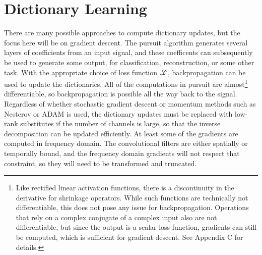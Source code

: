 \section{Dictionary Learning}
There are many possible approaches to compute dictionary updates, but the focus here will be on gradient descent. The pursuit algorithm generates several layers of coefficients from an input signal, and these coefficents can subsequently be used to generate some output, for classification, reconstruction, or some other task. With the appropriate choice of loss function $\mathscr{L}$, backpropagation can be used to update the dictionaries. All of the computations in pursuit are almost\footnote{Like rectified linear activation functions, there is a discontinuity in the derivative for shrinkage operators. While such functions are technically not differentiable, this does not pose any issue for backpropagation. Operations that rely on a complex conjugate of a complex input also are not differentiable, but since the output is a scalar loss function, gradients can still be computed, which is sufficient for gradient descent. See Appendix C for details.} differentiable, so backpropagation is possible all the way back to the signal. Regardless of whether stochastic gradient descent or momentum methods such as Nesterov \cite{sutskever2013importance} or ADAM \cite{kingma2017adam} is used, the dictionary updates must be replaced with low-rank substitutes if the number of channels is large, so that the inverse decomposition can be updated efficiently. At least some of the gradients are computed in frequency domain. The convolutional filters are either spatially or temporally bound, and the frequency domain gradients will not respect that constraint, so they will need to be transformed and truncated.

